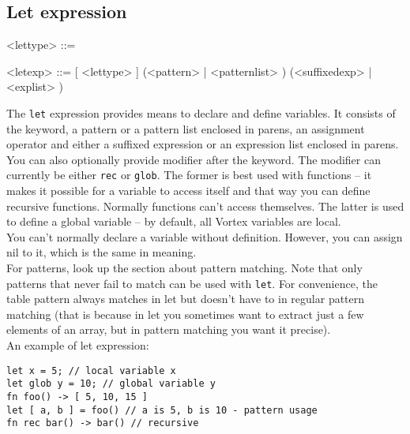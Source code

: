 \documentclass{article}
\newenvironment{bnf}
{
\begin{mdframed}
\begin{grammar}
}
{
\end{grammar}
\end{mdframed}
}
\begin{document}
\subsection{Let expression}
\begin{bnf}
<lettype> ::= 
    \alt {}

<letexp> ::=  [ <lettype> ] (<pattern> | \lit{(} <patternlist>
    \lit{)}) \lit{=} (<suffixedexp> | \lit{(} <explist> \lit{)})
\end{bnf}
The \verb|let| expression provides means to declare and define variables.
It consists of the keyword, a pattern or a pattern list enclosed in parens,
an assignment operator and either a suffixed expression or an expression
list enclosed in parens.\\
You can also optionally provide modifier after the keyword. The modifier
can currently be either \verb|rec| or \verb|glob|. The former is best used
with functions -- it makes it possible for a variable to access itself and
that way you can define recursive functions. Normally functions can't access
themselves. The latter is used to define a global variable -- by default,
all Vortex variables are local.\\
You can't normally declare a variable without definition. However, you can
assign nil to it, which is the same in meaning.\\
For patterns, look up the section about pattern matching. Note that only
patterns that never fail to match can be used with \verb|let|. For convenience,
the table pattern always matches in let but doesn't have to in regular
pattern matching (that is because in let you sometimes want to extract
just a few elements of an array, but in pattern matching you want it
precise).\\
An example of let expression:
\begin{lstlisting}[language=vortex]
let x = 5; // local variable x
let glob y = 10; // global variable y
fn foo() -> [ 5, 10, 15 ]
let [ a, b ] = foo() // a is 5, b is 10 - pattern usage
fn rec bar() -> bar() // recursive
\end{lstlisting}
\end{document}
